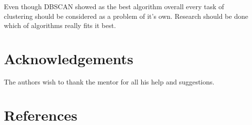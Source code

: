\documentclass[conference]{IEEEtran}
\begin{document}
Even though DBSCAN showed as the best algorithm overall every task of clustering should be
considered as a problem of it's own. Research should be done which of algorithms
really fits it best.

\section*{Acknowledgements}
The authors wish to thank the mentor for all his help and suggestions.

\section*{References}
\end{document}
